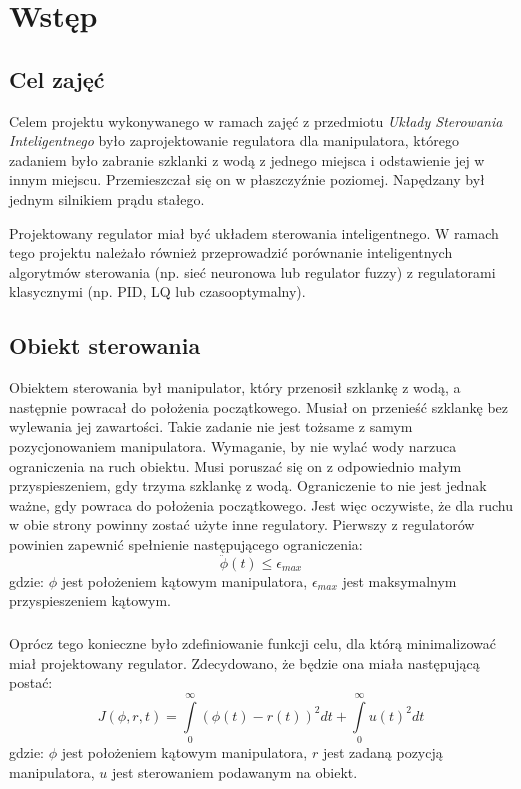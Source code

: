 \chapter{Wstęp}
\label{cha:wstep}

\section{Cel zajęć}

Celem projektu wykonywanego w ramach zajęć z przedmiotu \textit{Układy Sterowania Inteligentnego} było zaprojektowanie regulatora dla manipulatora, którego zadaniem było zabranie szklanki z wodą z jednego miejsca i odstawienie jej w innym miejscu. Przemieszczał się on w płaszczyźnie poziomej. Napędzany był jednym silnikiem prądu stałego.

Projektowany regulator miał być układem sterowania inteligentnego. W ramach tego projektu należało również przeprowadzić porównanie inteligentnych algorytmów sterowania (np. sieć neuronowa lub regulator fuzzy) z regulatorami klasycznymi (np. PID, LQ lub czasooptymalny).

\section{Obiekt sterowania}

Obiektem sterowania był manipulator, który przenosił szklankę z wodą, a następnie powracał do położenia początkowego. Musiał on przenieść szklankę bez wylewania jej zawartości. Takie zadanie nie jest tożsame z samym pozycjonowaniem manipulatora. Wymaganie, by nie wylać wody narzuca ograniczenia na ruch obiektu. Musi poruszać się on z odpowiednio małym przyspieszeniem, gdy trzyma szklankę z wodą. Ograniczenie to nie jest jednak ważne, gdy powraca do położenia początkowego. Jest więc oczywiste, że dla ruchu w obie strony powinny zostać użyte inne regulatory. Pierwszy z regulatorów powinien zapewnić spełnienie następującego ograniczenia:
\begin{equation}
\ddot \phi(t) \leqslant \epsilon_{max}
\end{equation}
\noindent gdzie:\newline
\(\phi\) jest położeniem kątowym manipulatora,\newline
\(\epsilon_{max}\) jest maksymalnym przyspieszeniem kątowym.

\paragraph*{}
Oprócz tego konieczne było zdefiniowanie funkcji celu, dla którą minimalizować miał projektowany regulator. Zdecydowano, że będzie ona miała następującą postać:
\begin{equation}
J(\phi,r,t)=\int\limits_{0}^{\infty} (\phi(t)-r(t))^2dt+\int\limits_{0}^{\infty} u(t)^2dt
\end{equation}
\noindent gdzie:\newline
\(\phi\) jest położeniem kątowym manipulatora,\newline
\(r\) jest zadaną pozycją manipulatora,\newline
\(u\) jest sterowaniem podawanym na obiekt.


